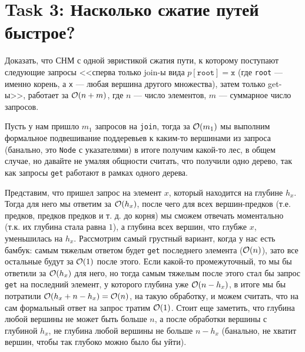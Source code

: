 \section{Task 3: Насколько сжатие путей быстрое?}
\begin{task}
    Доказать, что СНМ с одной эвристикой сжатия пути, к которому поступают следующие запросы <<сперва только join-ы вида $p[\texttt{root}] = \texttt{x}$ (где \texttt{root} --- именно корень, а \texttt{x} --- любая вершина другого множества), затем только get-ы>>, работает за $\mathcal{O}(n + m)$, где $n$ --- число элементов, $m$ --- суммарное число запросов.
\end{task}

\begin{solution}
    Пусть у нам пришло $m_1$ запросов на \texttt{join}, тогда за $\mathcal{O}(m_1)$ мы выполним формальное подвешивание поддеревьев к каким-то вершинами из запроса (банально, это \texttt{Node} с указателями) в итоге получим какой-то лес, в общем случае, но давайте не умаляя общности считать, что получили одно дерево, так как запросы \texttt{get} работают в рамках одного дерева.


    Представим, что пришел запрос на элемент $x$, который находится на глубине $h_x$. Тогда для него мы ответим за $\mathcal{O}(h_x)$, после чего для всех вершин-предков (т.е. предков, предков предков и т. д. до корня) мы сможем отвечать моментально (т.к. их глубина стала равна $1$), а глубина всех вершин, что глубже $x$, уменьшилась на $h_x$. Рассмотрим самый грустный вариант, когда у нас есть бамбук: самым тяжелым ответом будет \texttt{get} последнего элемента ($\mathcal{O}(n)$), зато все остальные будут за $\mathcal{O}(1)$ после этого. Если какой-то промежуточный, то мы бы ответили за $\mathcal{O}(h_x)$ для него, но тогда самым тяжелым после этого стал бы запрос \texttt{get} на последний элемент, у которого глубина уже $\mathcal{O}(n - h_x)$, в итоге мы бы потратили $\mathcal{O}(h_x + n - h_x) = \mathcal{O}(n)$, на такую обработку, и можем считать, что на сам формальный ответ на запрос тратим $\mathcal{O}(1)$. Стоит еще заметить, что глубина любой вершины не может быть больше $n$, а после обработки вершины с глубиной $h_x$, не глубина любой вершины не больше $n - h_x$ (банально, не хватит вершин, чтобы так глубоко можно было бы уйти).


\end{solution}
